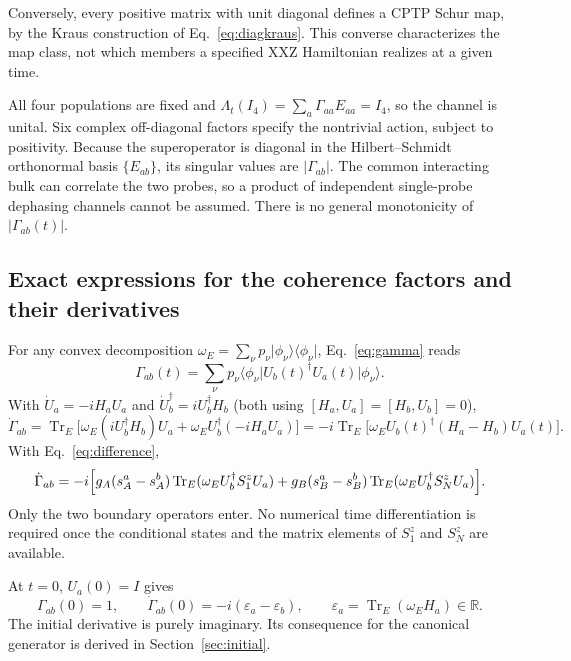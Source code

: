 \documentclass[11pt,a4paper]{article}
\newcommand{\ket}[1]{\lvert #1\rangle}
\newcommand{\bra}[1]{\langle #1\rvert}
\newcommand{\Tr}{\operatorname{Tr}}
\begin{document}
Conversely, every positive matrix with unit diagonal defines a CPTP
Schur map, by the Kraus construction of Eq.~\eqref{eq:diagkraus}. This
converse characterizes the map class, not which members a specified XXZ
Hamiltonian realizes at a given time.

All four populations are fixed and $\Lambda_t(I_4)=\sum_a\Gamma_{aa}E_{aa}=I_4$,
so the channel is unital. Six complex off-diagonal factors specify the
nontrivial action, subject to positivity. Because the superoperator is
diagonal in the Hilbert--Schmidt orthonormal basis $\{E_{ab}\}$, its
singular values are $|\Gamma_{ab}|$. The common interacting bulk can
correlate the two probes, so a product of independent single-probe
dephasing channels cannot be assumed. There is no general monotonicity
of $|\Gamma_{ab}(t)|$.

\subsection{Exact expressions for the coherence factors and their derivatives}
\label{sec:gammaderivative}

For any convex decomposition $\omega_E=\sum_\nu p_\nu\ket{\phi_\nu}\bra{\phi_\nu}$,
Eq.~\eqref{eq:gamma} reads
\begin{equation}
 \Gamma_{ab}(t)=\sum_\nu p_\nu
 \bra{\phi_\nu}U_b(t)^\dagger U_a(t)\ket{\phi_\nu}.
 \label{eq:gammaensemble}
\end{equation}
With $\dot U_a=-iH_aU_a$ and $\dot U_b^\dagger=iU_b^\dagger H_b$
(both using $[H_a,U_a]=[H_b,U_b]=0$),
\begin{equation}
 \dot\Gamma_{ab}
 =\Tr_E\bigl[\omega_E(iU_b^\dagger H_b)U_a+\omega_EU_b^\dagger(-iH_aU_a)\bigr]
 =-i\Tr_E\bigl[\omega_EU_b(t)^\dagger(H_a-H_b)U_a(t)\bigr].
 \label{eq:gammadot}
\end{equation}
With Eq.~\eqref{eq:difference},
\begin{equation}
 \dot\Gamma_{ab}=-i\Bigl[g_A(s_A^a-s_A^b)\Tr_E(\omega_EU_b^\dagger S_1^zU_a)
 +g_B(s_B^a-s_B^b)\Tr_E(\omega_EU_b^\dagger S_N^zU_a)\Bigr].
 \label{eq:gammadotboundary}
\end{equation}
Only the two boundary operators enter. No numerical time
differentiation is required once the conditional states and the matrix
elements of $S_1^z$ and $S_N^z$ are available.

At $t=0$, $U_a(0)=I$ gives
\begin{equation}
 \Gamma_{ab}(0)=1,\qquad
 \dot\Gamma_{ab}(0)=-i(\varepsilon_a-\varepsilon_b),\qquad
 \varepsilon_a=\Tr_E(\omega_EH_a)\in\mathbb R .
 \label{eq:initialderivative}
\end{equation}
The initial derivative is purely imaginary. Its consequence for the
canonical generator is derived in Section~\ref{sec:initial}.
\end{document}
